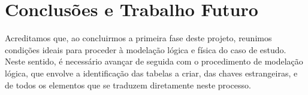 \documentclass[a4paper,12pt]{scrreprt}
\begin{document}
\chapter{Conclusões e Trabalho Futuro}


    Acreditamos que, ao concluirmos a primeira fase deste projeto, reunimos condições
    ideais para proceder à modelação lógica e física do caso de estudo.\\
    Neste sentido, é necessário avançar de seguida com o procedimento de modelação lógica,
    que envolve a identificação das tabelas a criar, das chaves estrangeiras,
    e de todos os elementos que se traduzem diretamente neste processo.



\renewcommand\bibname{Referências}

\nocite{*}
\printbibliography




\renewcommand{\nomname}{Lista de Siglas e Acrónimos}

\renewcommand{\nompreamble}{}


\printnomenclature
\end{document}
